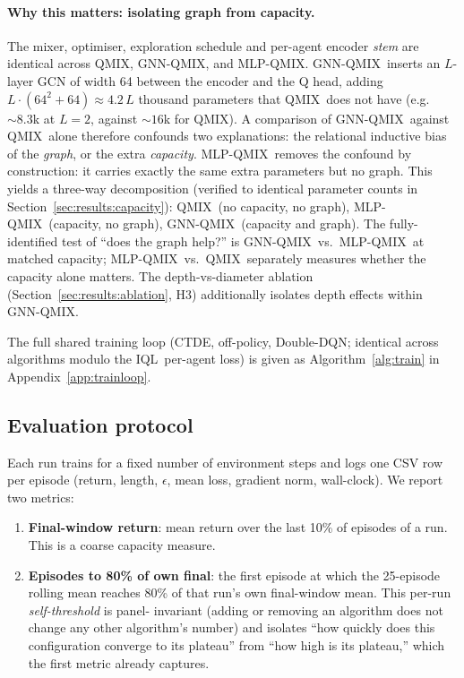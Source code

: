 \documentclass[manuscript, screen, review]{jair}
\newcommand{\algoname}[1]{\textsc{#1}}
\newcommand{\iql}{\algoname{IQL}}
\newcommand{\qmix}{\algoname{QMIX}}
\newcommand{\gnnqmix}{\algoname{GNN-QMIX}}
\newcommand{\mlpqmix}{\algoname{MLP-QMIX}}
\begin{document}
\paragraph{Why this matters: isolating graph from capacity.} The mixer,
optimiser, exploration schedule and per-agent encoder \emph{stem} are
identical across \qmix, \gnnqmix, and \mlpqmix. \gnnqmix\ inserts an
$L$-layer GCN of width 64 between the encoder and the Q head, adding
$L \cdot (64^2 + 64) \approx 4.2\,L$ thousand parameters that \qmix\ does
not have (e.g.\ $\sim 8.3$k at $L=2$, against $\sim 16$k for \qmix). A
comparison of \gnnqmix\ against \qmix\ alone therefore confounds two
explanations: the relational inductive bias of the \emph{graph}, or the
extra \emph{capacity}. \mlpqmix\ removes the confound by construction: it
carries exactly the same extra parameters but no graph. This yields a
three-way decomposition (verified to identical parameter counts in
Section~\ref{sec:results:capacity}): \qmix\ (no capacity, no graph),
\mlpqmix\ (capacity, no graph), \gnnqmix\ (capacity and graph). The
fully-identified test of ``does the graph help?'' is \gnnqmix\ vs.\
\mlpqmix\ at matched capacity; \mlpqmix\ vs.\ \qmix\ separately measures
whether the capacity alone matters. The depth-vs-diameter ablation
(Section~\ref{sec:results:ablation}, H3) additionally isolates depth
effects within \gnnqmix.

The full shared training loop (CTDE, off-policy, Double-DQN; identical
across algorithms modulo the \iql\ per-agent loss) is given as
Algorithm~\ref{alg:train} in Appendix~\ref{app:trainloop}.

\subsection{Evaluation protocol}
\label{sec:protocol}

Each run trains for a fixed number of environment steps and logs one CSV
row per episode (return, length, $\epsilon$, mean loss, gradient norm,
wall-clock). We report two metrics:

\begin{enumerate}[leftmargin=*,itemsep=0pt,topsep=2pt]
  \item \textbf{Final-window return}: mean return over the last 10\% of
        episodes of a run. This is a coarse capacity measure.
  \item \textbf{Episodes to 80\% of own final}: the first episode at
        which the 25-episode rolling mean reaches 80\% of that run's own
        final-window mean. This per-run \emph{self-threshold} is panel-
        invariant (adding or removing an algorithm does not change any
        other algorithm's number) and isolates ``how quickly does this
        configuration converge to its plateau'' from ``how high is its
        plateau,'' which the first metric already captures.
\end{enumerate}
\end{document}
